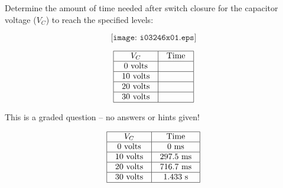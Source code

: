 

Determine the amount of time needed after switch closure for the capacitor voltage ($V_C$) to reach the specified levels:

$$\texttt{[image: i03246x01.eps]}$$


$$\vbox{\offinterlineskip
\halign{\strut
\vrule \quad\hfil # \ \hfil & 
\vrule \quad\hfil # \ \hfil \vrule \cr
\noalign{\hrule}
%
$V_C$ & Time  \cr
%
\noalign{\hrule}
%
0 volts &  \cr
%
\noalign{\hrule}
%
10 volts &  \cr
%
\noalign{\hrule}
%
20 volts &  \cr
%
\noalign{\hrule}
%
30 volts &  \cr
%
\noalign{\hrule}
} %
}$$ %

\vfil 

\eject






This is a graded question -- no answers or hints given!
 







$$\vbox{\offinterlineskip
\halign{\strut
\vrule \quad\hfil # \ \hfil & 
\vrule \quad\hfil # \ \hfil \vrule \cr
\noalign{\hrule}
%
$V_C$ & Time  \cr
%
\noalign{\hrule}
%
0 volts & 0 ms \cr
%
\noalign{\hrule}
%
10 volts & 297.5 ms \cr
%
\noalign{\hrule}
%
20 volts & 716.7 ms \cr
%
\noalign{\hrule}
%
30 volts & 1.433 s \cr
%
\noalign{\hrule}
} %
}$$ %




